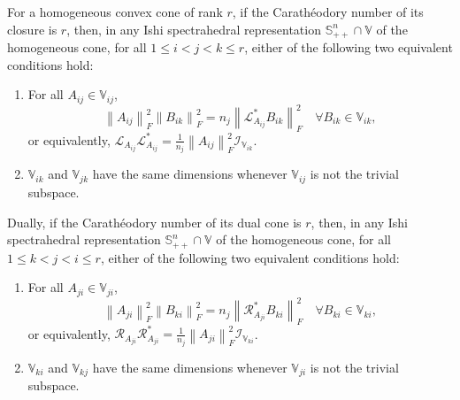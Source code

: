 \documentclass[10pt,a4paper]{amsart}
\begin{document}
\begin{proposition}\label{proposition:Caratheodorynumbersnecessary}
For a homogeneous convex cone of rank $r$, if the Carath\'eodory number of
its closure is $r$, then, in any Ishi spectrahedral representation
$\mathbb{S}^{n}_{++} \cap \mathbb{V}$ of the homogeneous cone, for all $1
\leq i < j < k \leq r$, either of the following two equivalent conditions
hold:
\begin{enumerate}[label=(\roman*)]
\item For all $A_{ij} \in \mathbb{V}_{ij}$,
\[
\left\lVert A_{ij}\right\rVert_{F}^{2} \left\lVert
B_{ik}\right\rVert_{F}^{2} = n_{j} \left\lVert \mathcal{L}^{*}_{A_{ij}}
B_{ik}\right\rVert_{F}^{2} \quad \forall B_{ik} \in \mathbb{V}_{ik},
\]
or equivalently, $\mathcal{L}_{A_{ij}} \mathcal{L}^{*}_{A_{ij}} =
\frac{1}{n_{j}} \left\lVert A_{ij}\right\rVert_{F}^{2}
\mathcal{I}_{\mathbb{V}_{ik}}$.

\item $\mathbb{V}_{ik}$ and $\mathbb{V}_{jk}$ have the same dimensions
whenever $\mathbb{V}_{ij}$ is not the trivial subspace.

\end{enumerate}
Dually, if the Carath\'eodory number of its dual cone is $r$, then, in any
Ishi spectrahedral representation $\mathbb{S}^{n}_{++} \cap \mathbb{V}$ of
the homogeneous cone, for all $1 \leq k < j < i \leq r$, either of the
following two equivalent conditions hold:
\begin{enumerate}[label=(\roman*)]
\item For all $A_{ji} \in \mathbb{V}_{ji}$,
\[
\left\lVert A_{ji}\right\rVert_{F}^{2} \left\lVert
B_{ki}\right\rVert_{F}^{2} = n_{j} \left\lVert \mathcal{R}^{*}_{A_{ji}}
B_{ki}\right\rVert_{F}^{2} \quad \forall B_{ki} \in \mathbb{V}_{ki},
\]
or equivalently, $\mathcal{R}_{A_{ji}} \mathcal{R}^{*}_{A_{ji}} =
\frac{1}{n_{j}} \left\lVert A_{ji}\right\rVert_{F}^{2}
\mathcal{I}_{\mathbb{V}_{ki}}$.

\item $\mathbb{V}_{ki}$ and $\mathbb{V}_{kj}$ have the same dimensions
whenever $\mathbb{V}_{ji}$ is not the trivial subspace.

\end{enumerate}
\end{proposition}
\end{document}
